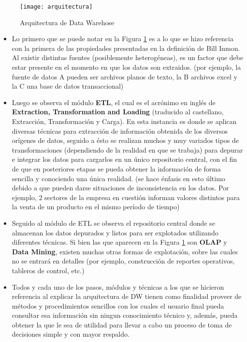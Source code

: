\documentclass[a4paper,11pt]{article}
\begin{document}
    \begin{figure}
      \begin{center}
        \texttt{[image: arquitectura]}
        \caption{Arquitectura de Data Warehose}
        \label{dw_arq}
      \end{center}
    \end{figure}
   
    \begin{itemize}
      \item Lo primero que se puede notar en la Figura \ref{dw_arq} es a lo que se hizo referencia con la primera de las propiedades presentadas en la
      definición de Bill Inmon. Al existir distintas fuentes (posiblemente heterogéneas), es un factor que debe estar presente en el momento en que los
      datos son extraidos. (por ejemplo, la fuente de datos A pueden ser archivos planos de texto, la B archivos excel y la C una base de datos 
      transaccional)\par
    
      \item Luego se observa el módulo \textbf{ETL}, el cual es el acrónimo en inglés de \textbf{Extraction, Transformation and Loading} (traducido al
      castellano, Extracción, Transformación y Carga). En esta instancia es donde se aplican diversas técnicas para extracción de información obtenida de
      los diversos orígenes de datos, seguido a ésto se realizan muchos y muy variados tipos de transformaciones (dependiendo de la realidad en que se
      trabaja) para depurar e integrar los datos para cargarlos en un único repositorio central, con el fin de que en posteriores etapas se pueda obtener
      la información de forma sencilla y conociendo una única realidad. (se hace énfasis en esto último debido a que pueden darse situaciones de
      inconsistencia en los datos. Por ejemplo, 2 sectores de la empresa en cuestión informan valores distintos para la venta de un producto en el mismo
      período de tiempo)\par
    
      \item Seguido al módulo de ETL se observa el repositorio central donde se almacenan los datos depurados y listos para ser explotados utilizando
      diferentes técnicas. Si bien las que aparecen en la Figura \ref{dw_arq} son \textbf{OLAP} y \textbf{Data Mining}, existen muchas otras formas de 
      explotación, sobre las cuales no se entrará en detalles (por ejemplo, construcción de reportes operativos, tableros de control, etc.)\par
    
      \item Todos y cada uno de los pasos, módulos y técnicas a los que se hicieron referencia al explicar la arquitectura de DW tienen como finalidad
      proveer de métodos y procedimientos sencillos con los cuales el usuario final pueda consultar esa información sin ningun conocimiento técnico y,
      además, pueda obtener la que le sea de utilidad para llevar a cabo un proceso de toma de decisiones simple y con mayor respaldo.
    \end{itemize}
    
\end{document}
